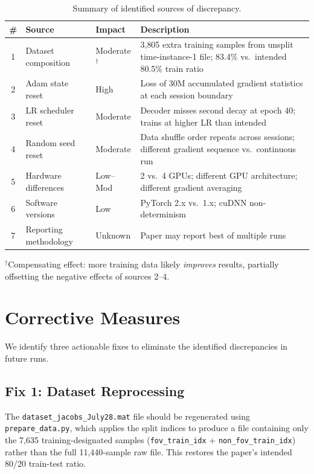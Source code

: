 \documentclass[12pt,a4paper]{article}
\begin{document}
\begin{table}[H]
\centering
\caption{Summary of identified sources of discrepancy.}
\label{tab:discrepancy_summary}
\begin{tabular}{@{}cllp{6.5cm}@{}}
\toprule
\textbf{\#} & \textbf{Source} & \textbf{Impact} & \textbf{Description} \\
\midrule
1 & Dataset composition  & Moderate$^\dagger$ & 3{,}805 extra training samples from unsplit time-instance-1 file; 83.4\% vs.\ intended 80.5\% train ratio \\
2 & Adam state reset     & High     & Loss of 30M accumulated gradient statistics at each session boundary \\
3 & LR scheduler reset   & Moderate & Decoder misses second decay at epoch 40; trains at higher LR than intended \\
4 & Random seed reset    & Moderate & Data shuffle order repeats across sessions; different gradient sequence vs.\ continuous run \\
5 & Hardware differences  & Low--Mod & 2 vs.\ 4 GPUs; different GPU architecture; different gradient averaging \\
6 & Software versions     & Low      & PyTorch 2.x vs.\ 1.x; cuDNN non-determinism \\
7 & Reporting methodology & Unknown  & Paper may report best of multiple runs \\
\bottomrule
\end{tabular}

\smallskip
\noindent\small{$^\dagger$Compensating effect: more training data likely \emph{improves} results, partially offsetting the negative effects of sources 2--4.}
\end{table}

\section{Corrective Measures}

We identify three actionable fixes to eliminate the identified discrepancies in future runs.

\subsection{Fix 1: Dataset Reprocessing}

The \texttt{dataset\_jacobs\_July28.mat} file should be regenerated using \texttt{prepare\_data.py}, which applies the split indices to produce a file containing only the 7{,}635 training-designated samples (\texttt{fov\_train\_idx} + \texttt{non\_fov\_train\_idx}) rather than the full 11{,}440-sample raw file. This restores the paper's intended 80/20 train-test ratio.
\end{document}

